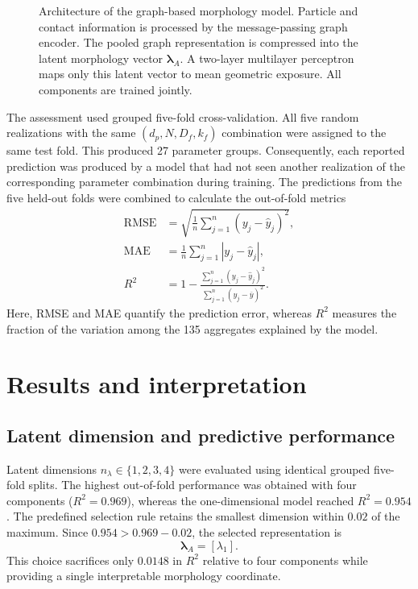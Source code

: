 \documentclass[12pt,a4paper]{article}
\begin{document}
\begin{figure}[!tbp]
{}
	
	\caption{Architecture of the graph-based morphology model. Particle and
		contact information is processed by the message-passing graph encoder.
		The pooled graph representation is compressed into the latent morphology
		vector $\boldsymbol{\lambda}_A$. A two-layer multilayer perceptron maps only
		this latent vector to mean geometric exposure. All
		components are trained jointly.}
	\label{fig:gnn_architecture}
\end{figure}

The assessment used grouped five-fold cross-validation. All five random
realizations with the same $(d_p,N,D_f,k_f)$ combination were assigned to the
same test fold. This produced 27 parameter groups.
Consequently, each reported prediction was produced by a model that had not
seen another realization of the corresponding parameter combination during
training. The predictions from the five held-out folds were combined to
calculate the out-of-fold metrics
\begin{align}
 \mathrm{RMSE} &=
 \sqrt{\frac{1}{n}\sum_{j=1}^{n}(y_j-\widehat{y}_j)^2},\\
 \mathrm{MAE} &=
 \frac{1}{n}\sum_{j=1}^{n}|y_j-\widehat{y}_j|,\\
 R^2 &= 1-
 \frac{\sum_{j=1}^{n}(y_j-\widehat{y}_j)^2}
      {\sum_{j=1}^{n}(y_j-\overline{y})^2}.
\end{align}
Here, RMSE and MAE quantify the prediction error, whereas $R^2$ measures the
fraction of the variation among the 135 aggregates explained by the model.

\section{Results and interpretation}
\label{sec:results_interpretation}

\subsection{Latent dimension and predictive performance}

Latent dimensions $n_\lambda\in\{1,2,3,4\}$ were evaluated using identical
grouped five-fold splits. The highest out-of-fold performance was obtained with
four components ($R^2=0.969$), whereas the one-dimensional model reached
$R^2=0.954$. The predefined selection rule retains the smallest dimension
within $0.02$ of the maximum. Since $0.954>0.969-0.02$, the selected
representation is
\begin{equation}
	\boldsymbol{\lambda}_A=[\lambda_1].
\end{equation}
This choice sacrifices only $0.0148$ in $R^2$ relative to four components while
providing a single interpretable morphology coordinate.
\end{document}

